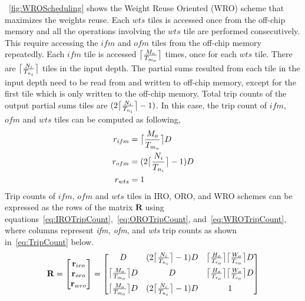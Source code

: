 \figurename~\ref{fig:WROScheduling} shows the Weight Reuse Oriented (WRO) scheme that maximizes the  weights reuse. Each $wts$ tiles is accessed once from the off-chip memory and all the operations involving the $wts$ tile are performed consecutively. This require accessing the $ifm$ and $ofm$ tiles from the off-chip memory repeatedly. Each $ifm$ tile  is accessed $\ceil[\big]{\frac{M_o}{T_{m_o}}}$ times, once for each $wts$ tile. There are $\ceil[\big]{\frac{N_i}{T_{n_i}}}$ tiles in the input depth. The partial sums resulted from each tile in the input depth need to be read from and written to off-chip memory, except for the first tile which is only written to the off-chip memory. Total trip counts of the output partial sums tiles are $(2\ceil[\big]{\frac{N_i}{T_{n_i}}}-1)$. In this case, the trip count of $ifm$, $ofm$ and $wts$ tiles can be computed as following,
\begin{align}\label{eq:WROTripCount}
	\begin{split}
		r_{ifm} &= \ceil[\big]{\frac{M_o}{T_{m_o}}}D\\
		r_{ofm}&= (2\ceil[\big]{\frac{N_i}{T_{n_i}}}-1)D \\
		r_{wts} &= 1
	\end{split}
\end{align}
Trip counts of $ifm$, $ofm$ and $wts$ tiles in IRO, ORO, and WRO schemes can be expressed as the rows of the matrix $\mathbf{R}$ using equations~\ref{eq:IROTripCount},~\ref{eq:OROTripCount}, and~\ref{eq:WROTripCount}, where columns represent \textit{ifm, ofm}, and \textit{wts} trip counts as shown in~\eqref{eq:TripCount} below.
\begin{align}\label{eq:TripCount}
	\mathbf{R}=
	\begin{bmatrix}
		\mathbf{r}_{iro} \\  \mathbf{r}_{oro} \\ \mathbf{r}_{wro} \\
	\end{bmatrix}=
	\begin{bmatrix}
		D&(2\ceil[\big]{\frac{N_i}{T_{n_i}}}-1)D&\ceil[\big]{\frac{H_o}{T_{r_o}}}\ceil[\big]{\frac{W_o}{T_{c_o}}}D\\[6pt]
		\ceil[\big]{\frac{M_o}{T_{m_o}}}D&D&\ceil[\big]{\frac{H_o}{T_{r_o}}}\ceil[\big]{\frac{W_o}{T_{c_o}}} D\\[6pt]
		\ceil[\big]{\frac{M_o}{T_{m_o}}}D&(2\ceil[\big]{\frac{N_i}{T_{n_i}}}-1)D&1\\
	\end{bmatrix}
\end{align}
